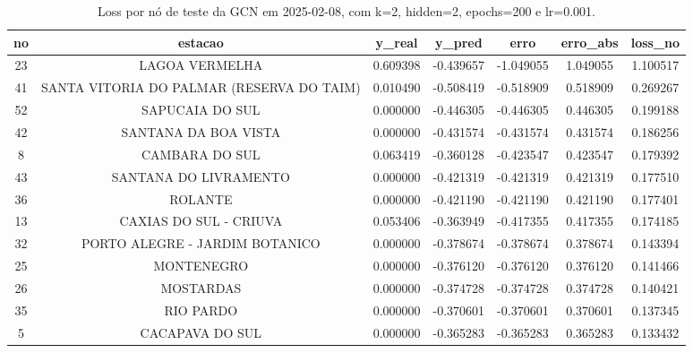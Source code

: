 \begin{table}[h]
\centering
\caption{Loss por nó de teste da GCN em 2025-02-08, com k=2, hidden=2, epochs=200 e lr=0.001.}
\label{tab:gcn_loss_nodes_k2_hidden2}
\begin{tabular}{ccccccc}
\toprule
no & estacao & y\_real & y\_pred & erro & erro\_abs & loss\_no \\
\midrule
23 & LAGOA VERMELHA & 0.609398 & -0.439657 & -1.049055 & 1.049055 & 1.100517 \\
41 & SANTA VITORIA DO PALMAR (RESERVA DO TAIM) & 0.010490 & -0.508419 & -0.518909 & 0.518909 & 0.269267 \\
52 & SAPUCAIA DO SUL & 0.000000 & -0.446305 & -0.446305 & 0.446305 & 0.199188 \\
42 & SANTANA DA BOA VISTA & 0.000000 & -0.431574 & -0.431574 & 0.431574 & 0.186256 \\
8 & CAMBARA DO SUL & 0.063419 & -0.360128 & -0.423547 & 0.423547 & 0.179392 \\
43 & SANTANA DO LIVRAMENTO & 0.000000 & -0.421319 & -0.421319 & 0.421319 & 0.177510 \\
36 & ROLANTE & 0.000000 & -0.421190 & -0.421190 & 0.421190 & 0.177401 \\
13 & CAXIAS DO SUL - CRIUVA & 0.053406 & -0.363949 & -0.417355 & 0.417355 & 0.174185 \\
32 & PORTO ALEGRE - JARDIM BOTANICO & 0.000000 & -0.378674 & -0.378674 & 0.378674 & 0.143394 \\
25 & MONTENEGRO & 0.000000 & -0.376120 & -0.376120 & 0.376120 & 0.141466 \\
26 & MOSTARDAS & 0.000000 & -0.374728 & -0.374728 & 0.374728 & 0.140421 \\
35 & RIO PARDO & 0.000000 & -0.370601 & -0.370601 & 0.370601 & 0.137345 \\
5 & CACAPAVA DO SUL & 0.000000 & -0.365283 & -0.365283 & 0.365283 & 0.133432 \\
\bottomrule
\end{tabular}
\end{table}
